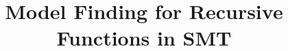 
\newcommand\ty[1]{\con{#1}}
\newcommand{\Bool}{\ty{Bool}}
\newcommand{\ltrue}{\top}
\newcommand{\lfalse}{\bot}
\newcommand{\lite}{\con{ite}}

\newcommand\concret{\gamma} %

\newcommand{\boolop}{\con{b}}
\newcommand{\forallf}[1]{\forall_{\!#1\:}}
\newcommand{\fnull}{\emptyset}
\newcommand{\vecfarg}[1]{\vec{\concret}_{#1}}
\newcommand{\farg}[1]{\concret_{#1}}
\newcommand{\fargx}[2]{\concret_{#1,#2}}
\newcommand{\fargtype}[1]{\alpha_{#1}}

\newcommand{\Sigmalia}{\Sigma_{\mathcalx{LIA}}}
\newcommand{\extendsig}[1]{\mathcalx{E}( #1 )}

\newcommand{\rem}[1]{\textcolor{red}{[#1]}}
\newcommand{\ajr}[1]{\rem{#1 --ajr}}
\newcommand{\jb}[1]{\rem{#1 --jb}}
\newcommand{\ct}[1]{\rem{#1 --ct}}

\newcommand{\negvthinspace}{\kern-0.083333em}
\newcommand{\vthinspace}{\kern+0.083333em}
\newcommand{\vvthinspace}{\kern+0.0416666em}
\newcommand{\typ}[1]{^{\vthinspace #1}}

\newcommand{\definefunreccmd}{\con{define}\text{-}\con{fun}\text{-}\con{rec}}
\newcommand{\definefunsreccmd}{\con{define}\text{-}\con{funs}\text{-}\con{rec}}

\newcommand{\Mo}{{\mathcal{I}}}

\newcommand{\euf}{\ensuremath{\mathcalx{UF}}\xspace}
\newcommand{\ari}{\ensuremath{\mathcalx{A}}\xspace}

\newcommand{\absconstraints}{\mathrm{X}}

%
%
\usepackage{program}

\def\squareforqed{\hbox{\rlap{$\sqcap$}$\sqcup$}}

\newcommand\xend{{\hfill$\scriptstyle\blacksquare$}}
\renewcommand\qed{{\hfill$\squareforqed$}}


\let\labelitemi=\labelitemii %
\makeatletter
\ps@myheadings
\makeatother



\title{Model Finding for Recursive Functions in SMT}

